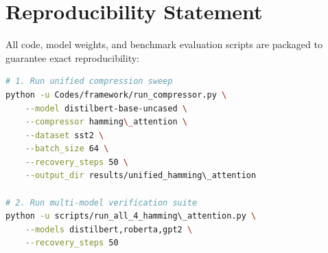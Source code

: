 \section{Reproducibility Statement}
All code, model weights, and benchmark evaluation scripts are packaged to guarantee exact reproducibility:
\begin{lstlisting}[language=bash]
# 1. Run unified compression sweep
python -u Codes/framework/run_compressor.py \
    --model distilbert-base-uncased \
    --compressor hamming\_attention \
    --dataset sst2 \
    --batch_size 64 \
    --recovery_steps 50 \
    --output_dir results/unified_hamming\_attention

# 2. Run multi-model verification suite
python -u scripts/run_all_4_hamming\_attention.py \
    --models distilbert,roberta,gpt2 \
    --recovery_steps 50
\end{lstlisting}
